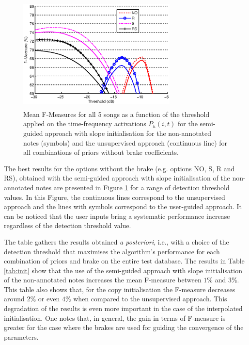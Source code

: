 \documentclass{article}
\begin{document}
\begin{figure}[!ht]
\begin{minipage}[b]{1.0\linewidth}
  \centering
  \centerline{\includegraphics[width=8cm, height=5.8cm]{figures/finalnobrake.eps}}
\end{minipage}
\caption{Mean F-Measures for all 5 songs as a function of the threshold applied on the time-frequency activations $P_h(i,t)$ for the semi-guided approach with slope initialisation for the non-annotated notes (symbols) and the unsupervised approach (continuous line) for all combinations of priors without brake coefficients.}
\label{fig:fxt-nobrake}
\end{figure}


The best results for the options without the brake (e.g. options NO, S, R and RS), obtained with the semi-guided approach with slope initialisation of the non-annotated notes are presented in Figure \ref{fig:fxt-nobrake} for a range of detection threshold values. In this Figure, the continuous lines correspond to the unsupervised approach and the lines with symbols correspond to the user-guided approach.  It can be noticed that the user inputs bring a systematic performance increase regardless of the detection threshold value.

The table gathers the results obtained \textit{a posteriori}, i.e., with a choice of the detection threshold that maximises the algorithm's performance for each combination of priors and brake on the entire test database.
The results in Table \ref{tab:init} show that the use of the semi-guided approach with slope initialisation of the non-annotated notes increases the mean F-measure between $1\%$ and $3\%$. This table also shows that, for the copy initialisation the F-measure decreases around $2\%$ or even $4\%$ when compared to the unsupervised approach. This degradation of the results is even more important in the case of the interpolated initialisation. One notes that, in general, the gain in terms of F-measure is greater for the case where the brakes are used for guiding the convergence of the parameters.
\end{document}
